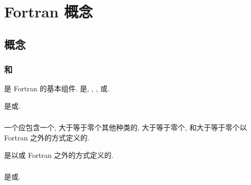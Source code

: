 \chapter{Fortran 概念}

\section{\ProgramUnit{}概念}

\subsection{\ProgramUnit{}和\ScopingUnit{}}

\ProgramUnit{}是 Fortran \Program{}的基本组件. \ProgramUnit{}是\MainProgram{}, \ExternalSubprogram{}, \Module{}, 或\Submodule{}.

\Subprogram{}是\Function{}\Subprogram{}或\Subroutine{}\Subprogram{}.

\subsection{\Program{}}

一个\Program{}应包含一个\MainProgram{}, 大于等于零个其他种类的\ProgramUnit{}, 大于等于零个\ExternalProcedure{}, 和大于等于零个以 Fortran 之外的方式定义的\Entity{}.

\ExternalProcedure{}是以\ExternalSubprogram{}或 Fortran 之外的方式定义的\Procedure{}.

\subsection{\Procedure{}}

\Procedure{}是\Function{}或\Subroutine{}.
